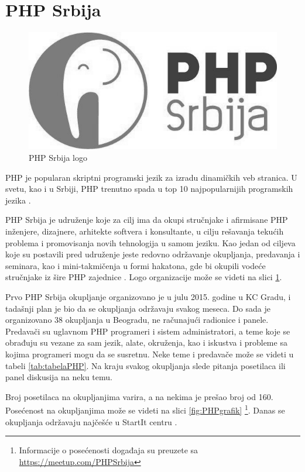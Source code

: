 \documentclass[a4paper]{article}
\begin{document}
{\section{PHP Srbija}
\begin{figure}[H]
\begin{center}
\includegraphics[scale=0.25]{php_gray.jpg}
\end{center}
\caption{PHP Srbija logo}
\label{fig:phpSrbija}
\end{figure}
PHP je popularan skriptni programski jezik za izradu dinamičkih veb stranica. U svetu, kao i u Srbiji, PHP trenutno spada u top 10 najpopularnijih programskih jezika \cite{phpMostPopular,phpSerbiaPopularity}.

PHP Srbija je udruženje koje za cilj ima da okupi stručnjake i afirmisane PHP inženjere, dizajnere, arhitekte softvera i konsultante, u cilju rešavanja tekućih problema i promovisanja novih tehnologija u samom jeziku. Kao jedan od ciljeva koje su postavili pred udruženje jeste redovno održavanje okupljanja, predavanja i seminara, kao i mini-takmičenja u formi hakatona, gde bi okupili vodeće stručnjake iz šire PHP zajednice \cite{phpSrbijaSajt}. Logo organizacije može se videti na slici \ref{fig:phpSrbija}.

Prvo PHP Srbija okupljanje organizovano je u julu 2015. godine u KC Gradu, i tadašnji plan je bio da se okupljanja održavaju svakog meseca. Do sada je organizovano 38 okupljanja u Beogradu, ne računajući radionice i panele. Predavači su uglavnom PHP programeri i sistem administratori, a teme koje se obrađuju su vezane za sam jezik, alate, okruženja, kao i iskustva i probleme sa kojima programeri mogu da se susretnu. Neke teme i predavače može se videti u tabeli \ref{tab:tabelaPHP}.  Na kraju svakog okupljanja slede pitanja posetilaca ili panel diskusija na neku temu.

Broj posetilaca na okupljanjima varira, a na nekima je prešao broj od 160. Posećenost na okupljanjima može se videti na slici \ref{fig:PHPgrafik} \footnote{Informacije o posećenosti događaja su preuzete sa \url{https://meetup.com/PHPSrbija}}. Danas se okupljanja održavaju najčešće u StartIt centru \cite{aboutStarit}.

}
\end{document}
